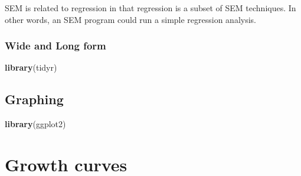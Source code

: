 \documentclass[]{book}
\newenvironment{Shaded}{\begin{snugshade}}{\end{snugshade}}
\newcommand{\KeywordTok}[1]{\textcolor[rgb]{0.13,0.29,0.53}{\textbf{{#1}}}}
\newcommand{\NormalTok}[1]{{#1}}
\begin{document}
SEM is related to regression in that regression is a subset of SEM
techniques. In other words, an SEM program could run a simple regression
analysis.

\subsection{Wide and Long form}\label{wide-and-long-form}

\begin{Shaded}
\begin{Highlighting}[]
\KeywordTok{library}\NormalTok{(tidyr)}
\end{Highlighting}
\end{Shaded}

\section{Graphing}\label{graphing}

\begin{Shaded}
\begin{Highlighting}[]
\KeywordTok{library}\NormalTok{(ggplot2)}
\end{Highlighting}
\end{Shaded}

\chapter{Growth curves}\label{growth-curves}


\end{document}
